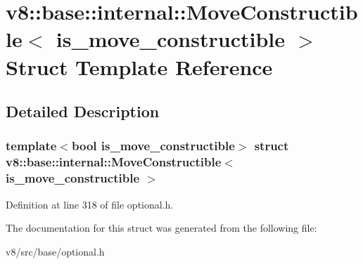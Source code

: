 \hypertarget{structv8_1_1base_1_1internal_1_1MoveConstructible}{}\section{v8\+:\+:base\+:\+:internal\+:\+:Move\+Constructible$<$ is\+\_\+move\+\_\+constructible $>$ Struct Template Reference}
\label{structv8_1_1base_1_1internal_1_1MoveConstructible}


\subsection{Detailed Description}
\subsubsection*{template$<$bool is\+\_\+move\+\_\+constructible$>$\newline
struct v8\+::base\+::internal\+::\+Move\+Constructible$<$ is\+\_\+move\+\_\+constructible $>$}



Definition at line 318 of file optional.\+h.



The documentation for this struct was generated from the following file\+:\begin{DoxyCompactItemize}
\item 
v8/src/base/optional.\+h\end{DoxyCompactItemize}
